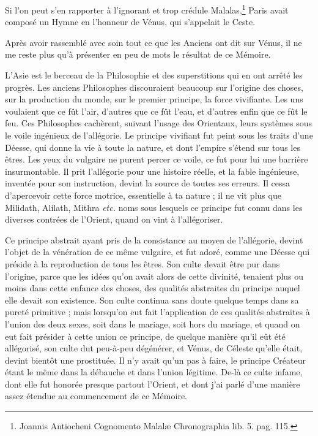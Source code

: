 \documentclass[a4paper, 18pt, oneside]{article}
\begin{document}
Si l'on peut s'en rapporter à l'ignorant et trop crédule Malalas,\footnote{Joannis Antiocheni Cognomento Malalæ Chronographia lib. 5. pag. 115.} Paris avait composé un Hymne en l'honneur de Vénus, qui s'appelait le Ceste.

Après avoir rassemblé avec soin tout ce que les Anciens ont dit sur Vénus, il ne me reste plus qu'à présenter en peu de mots le résultat de ce Mémoire.

L'Asie est le berceau de la Philosophie et des superstitions qui en ont arrêté les progrès. Les anciens Philosophes discouraient beaucoup sur l'origine des choses, sur la production du monde, sur le premier principe, la force vivifiante. Les uns voulaient que ce fût l'air, d'autres que ce fût l'eau, et d'autres enfin que ce fût le feu. Ces Philosophes cachèrent, suivant l'usage des Orientaux, leurs systèmes sous le voile ingénieux de l'allégorie. Le principe vivifiant fut peint sous les traits d'une Déesse, qui donne la vie à toute la nature, et dont l'empire s'étend sur tous les êtres. Les yeux du vulgaire ne purent percer ce voile, ce fut pour lui une barrière insurmontable. Il prit l'allégorie pour une histoire réelle, et la fable ingénieuse, inventée pour son instruction, devint la source de toutes ses erreurs. Il cessa d'apercevoir cette force motrice, essentielle à ta nature ; il ne vit plus que Milidath, Alilath, Mithra \emph{etc.} noms sous lesquels ce principe fut connu dans les diverses contrées de l'Orient, quand on vint à l'allégoriser.

Ce principe abstrait ayant pris de la consistance au moyen de l'allégorie, devint l'objet de la vénération de ce même vulgaire, et fut adoré, comme une Déesse qui préside à la reproduction de tous les êtres. Son culte devait être pur dans l'origine, parce que les idées qu'on avait alors de cette divinité, tenaient plus ou moins dans cette enfance des choses, des qualités abstraites du principe auquel elle devait son existence. Son culte continua sans doute quelque temps dans sa pureté primitive ; mais lorsqu'on eut fait l'application de ces qualités abstraites à l'union des deux sexes, soit dans le mariage, soit hors du mariage, et quand on eut fait présider à cette union ce principe, de quelque manière qu'il eût été allégorisé, son culte dut peu-à-peu dégénérer, et Vénus, de Céleste qu'elle était, devint bientôt une prostituée. Il n'y avait qu'un pas à faire, le principe Créateur étant le même dans la débauche et dans l'union légitime. De-là ce culte infame, dont elle fut honorée presque partout l'Orient, et dont j'ai parlé d'une manière assez étendue au commencement de ce Mémoire.
\end{document}
